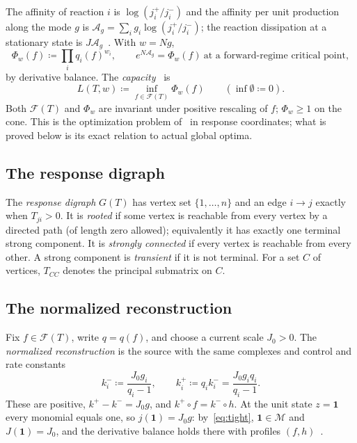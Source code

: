 \documentclass[11pt,a4paper]{article}
\theoremstyle{plain}
\theoremstyle{definition}
\theoremstyle{remark}
\numberwithin{equation}{section}
\newcommand{\one}{\mathbf{1}}
\newcommand{\cone}{\mathcal{F}}
\newcommand{\fiber}{\mathcal{M}}
\renewcommand{\odot}{\circ}
\begin{document}
The affinity of reaction $i$ is $\log(j^+_i/j^-_i)$ and the affinity per unit production along the mode $g$ is $\mathcal A_g=\sum_ig_i\log(j^+_i/j^-_i)$; the reaction dissipation at a stationary state is $J\mathcal A_g$~\citep{polettini2014,rao2016}. With $w=Ng$,
\begin{equation}\label{eq:affinity}
 \Phi_w(f)\coloneqq\prod_iq_i(f)^{w_i},\qquad e^{N\mathcal A_g}=\Phi_w(f)\ \text{at a forward-regime critical point},
\end{equation}
by derivative balance. The \emph{capacity}~\citep{companion2026} is
\begin{equation}\label{eq:capacity}
 L(T,w)\coloneqq\inf_{f\in\cone(T)}\Phi_w(f)\qquad(\inf\emptyset\coloneqq0).
\end{equation}
Both $\cone(T)$ and $\Phi_w$ are invariant under positive rescaling of $f$; $\Phi_w\ge1$ on the cone. This is the optimization problem of~\citep[Supplementary Note~11]{despons2024} in response coordinates; what is proved below is its exact relation to actual global optima.

\subsection{The response digraph}
The \emph{response digraph} $G(T)$ has vertex set $\{1,\dots,n\}$ and an edge $i\to j$ exactly when $T_{ji}>0$. It is \emph{rooted} if some vertex is reachable from every vertex by a directed path (of length zero allowed); equivalently it has exactly one terminal strong component. It is \emph{strongly connected} if every vertex is reachable from every other. A strong component is \emph{transient} if it is not terminal. For a set $C$ of vertices, $T_{CC}$ denotes the principal submatrix on $C$.

\subsection{The normalized reconstruction}
Fix $f\in\cone(T)$, write $q=q(f)$, and choose a current scale $J_0>0$. The \emph{normalized reconstruction} is the source with the same complexes and control and rate constants
\begin{equation}\label{eq:rates}
 k^-_i\coloneqq\frac{J_0g_i}{q_i-1},\qquad k^+_i\coloneqq q_ik^-_i=\frac{J_0g_iq_i}{q_i-1}.
\end{equation}
These are positive, $k^+-k^-=J_0g$, and $k^+\odot f=k^-\odot h$. At the unit state $z=\one$ every monomial equals one, so $j(\one)=J_0g$: by~\eqref{eq:tight}, $\one\in\fiber$ and $J(\one)=J_0$, and the derivative balance holds there with profiles $(f,h)$~\citep[Lemma~5.2]{companion2026}.
\end{document}
